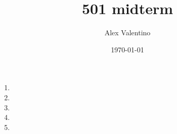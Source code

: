 \documentclass[12pt, letterpaper]{article}
\date{\today}
\author{Alex Valentino}
\title{501 midterm}
\begin{document}
\begin{enumerate}
	\item
	\item
	\item
	\item
	\item
\end{enumerate}
\end{document}
